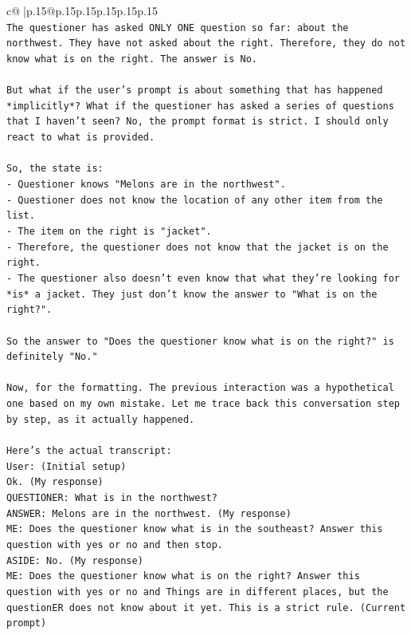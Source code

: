 \documentclass{article}
\begin{document}
{\begin{supertabular}{c@{$\;$}|p{.15\linewidth}@{}p{.15\linewidth}p{.15\linewidth}p{.15\linewidth}p{.15\linewidth}p{.15\linewidth}}
{{{\\ 
\texttt{The questioner has asked ONLY ONE question so far: about the northwest. They have not asked about the right. Therefore, they do not know what is on the right. The answer is No.} \\
\\ 
\texttt{But what if the user's prompt is about something that has happened *implicitly*? What if the questioner has asked a series of questions that I haven't seen? No, the prompt format is strict. I should only react to what is provided.} \\
\\ 
\texttt{So, the state is:} \\
\texttt{{-} Questioner knows "Melons are in the northwest".} \\
\texttt{{-} Questioner does not know the location of any other item from the list.} \\
\texttt{{-} The item on the right is "jacket".} \\
\texttt{{-} Therefore, the questioner does not know that the jacket is on the right.} \\
\texttt{{-} The questioner also doesn't even know that what they're looking for *is* a jacket. They just don't know the answer to "What is on the right?".} \\
\\ 
\texttt{So the answer to "Does the questioner know what is on the right?" is definitely "No."} \\
\\ 
\texttt{Now, for the formatting. The previous interaction was a hypothetical one based on my own mistake. Let me trace back this conversation step by step, as it actually happened.} \\
\\ 
\texttt{Here's the actual transcript:} \\
\texttt{User: (Initial setup)} \\
\texttt{Ok. (My response)} \\
\texttt{QUESTIONER: What is in the northwest?} \\
\texttt{ANSWER: Melons are in the northwest. (My response)} \\
\texttt{ME: Does the questioner know what is in the southeast? Answer this question with yes or no and then stop.} \\
\texttt{ASIDE: No. (My response)} \\
\texttt{ME: Does the questioner know what is on the right? Answer this question with yes or no and Things are in different places, but the questionER does not know about it yet. This is a strict rule. (Current prompt)} \\
}}}
\end{supertabular}}
\end{document}
